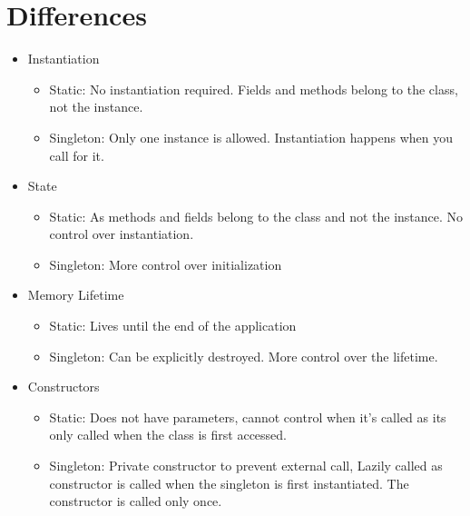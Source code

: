 \section{Differences}
\begin{itemize}
	\item Instantiation
	\begin{itemize}
		\item Static: No instantiation required. Fields and methods belong to the class, not the instance.
		\item Singleton: Only one instance is allowed. Instantiation happens when you call for it.			
	\end{itemize}
	
	\item State
	\begin{itemize}
		\item Static: As methods and fields belong to the class and not the instance. No control over instantiation.
		\item Singleton: More control over initialization			
	\end{itemize}
	
	\item Memory Lifetime
	\begin{itemize}
		\item Static: Lives until the end of the application
		\item Singleton: Can be explicitly destroyed. More control over the lifetime.		
	\end{itemize}
	
	\item Constructors
	\begin{itemize}
		\item Static: Does not have parameters, cannot control when it's called as its only called when the class is first accessed.
		\item Singleton: Private constructor to prevent external call, Lazily called as constructor is called when the singleton is first instantiated. The constructor is called only once.	
	\end{itemize}
\end{itemize}